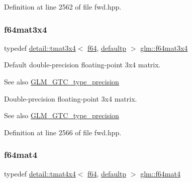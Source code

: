 Definition at line 2562 of file fwd.\+hpp.

\mbox{\label{group__gtc__type__precision_gac9468e5fa519d06b452d3126bb22a597}} 
\subsubsection{\texorpdfstring{f64mat3x4}{f64mat3x4}}
{\footnotesize\ttfamily typedef \hyperlink{structglm_1_1detail_1_1tmat3x4}{detail\+::tmat3x4}$<$ \hyperlink{group__gtc__type__precision_ga2bba392e555124b36cde6abba349bab3}{f64}, \hyperlink{namespaceglm_a0f04f086094c747d227af4425893f545a9d21ccd8b5a009ec7eb7677befc3bf51}{defaultp} $>$ \hyperlink{group__gtc__type__precision_gac9468e5fa519d06b452d3126bb22a597}{glm\+::f64mat3x4}}

Default double-\/precision floating-\/point 3x4 matrix. \begin{DoxySeeAlso}{See also}
\hyperlink{group__gtc__type__precision}{G\+L\+M\+\_\+\+G\+T\+C\+\_\+type\+\_\+precision}
\end{DoxySeeAlso}
Double-\/precision floating-\/point 3x4 matrix. \begin{DoxySeeAlso}{See also}
\hyperlink{group__gtc__type__precision}{G\+L\+M\+\_\+\+G\+T\+C\+\_\+type\+\_\+precision} 
\end{DoxySeeAlso}


Definition at line 2566 of file fwd.\+hpp.

\mbox{\label{group__gtc__type__precision_ga1e2d73ea989e6a5abd90cbe9f1025a41}} 
\subsubsection{\texorpdfstring{f64mat4}{f64mat4}}
{\footnotesize\ttfamily typedef \hyperlink{structglm_1_1detail_1_1tmat4x4}{detail\+::tmat4x4}$<$ \hyperlink{group__gtc__type__precision_ga2bba392e555124b36cde6abba349bab3}{f64}, \hyperlink{namespaceglm_a0f04f086094c747d227af4425893f545a9d21ccd8b5a009ec7eb7677befc3bf51}{defaultp} $>$ \hyperlink{group__gtc__type__precision_ga1e2d73ea989e6a5abd90cbe9f1025a41}{glm\+::f64mat4}}

